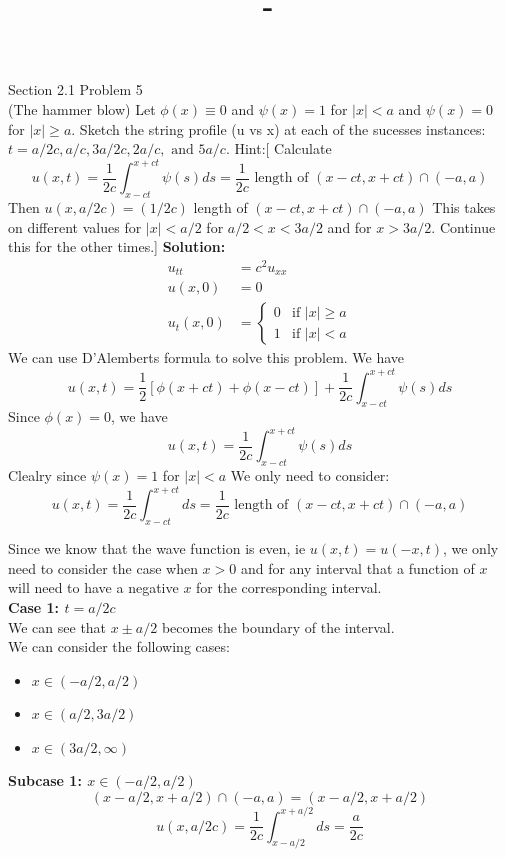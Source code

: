 \documentclass[answers,12pt,addpoints]{exam}
\author{\name}
\title{\course \ - \assignment}
\begin{document}
\maketitle
\begin{questions}

\question Section 2.1 Problem 5\\
(The hammer blow) Let $\phi(x) \equiv 0$ and $\psi(x) = 1$ for $|x| < a$ and $\psi(x) = 0$ for $|x| \geq a$. Sketch the string profile (u vs x) at each of the sucesses instances: $t = a/2c, a/c, 3a/2c, 2a/c, \text{ and } 5a/c$. Hint:[ Calculate
$$ u(x,t) = \frac{1}{2c} \int_{x-ct}^{x+ct} \psi(s) ds = \frac{1}{2c} \text{ length of } (x-ct,x+ct) \cap (-a,a)$$
Then $u(x, a/2c) = (1/2c)${ length of $(x-ct,x+ct) \cap (-a,a)$} This takes on different values for $|x| < a/2$ for $a/2 < x < 3a/2$ and for $x > 3a/2$. Continue this for the other times.]
\textbf{Solution:}\\
\begin{align*}
    u_{tt} &= c^2 u_{xx} \\
    u(x,0) &= 0 \\
    u_t(x,0) &= \begin{cases}
    0 & \text{if } |x| \geq a \\
    1 & \text{if } |x| < a
    \end{cases}
\end{align*}
We can use D'Alemberts formula to solve this problem. We have
$$ u(x,t) = \frac{1}{2} \left[ \phi(x+ct) + \phi(x-ct) \right] + \frac{1}{2c} \int_{x-ct}^{x+ct} \psi(s) ds $$
Since $\phi(x) = 0$, we have
$$ u(x,t) = \frac{1}{2c} \int_{x-ct}^{x+ct} \psi(s) ds$$
Clealry since $\psi(x) = 1$ for $|x| < a$ We only need to consider:
$$ u(x,t) = \frac{1}{2c} \int_{x-ct}^{x+ct} ds = \frac{1}{2c} \text{ length of } (x-ct,x+ct) \cap (-a,a)$$

Since we know that the wave function is even, ie $u(x,t) = u(-x,t)$, we only need to consider the case when $x > 0$ and for any interval that a function of $x$ will need to have a negative $x$ for the corresponding interval.\\

\textbf{Case 1: $t = a/2c$}\\
We can see that $x \pm a/2$ becomes the boundary of the interval. \\
We can consider the following cases:
\begin{itemize}
    \item $ x \in (-a/2, a/2)$
    \item $ x \in (a/2, 3a/2)$
    \item $ x \in (3a/2, \infty)$
\end{itemize}
\textbf{Subcase 1: $x \in (-a/2, a/2)$}\\
$$(x-a/2, x+a/2) \cap (-a,a) = (x-a/2, x+a/2)$$
$$u(x,a/2c) = \frac{1}{2c} \int_{x-a/2}^{x+a/2} ds = \frac{a}{2c}$$


\end{questions}
\end{document}
